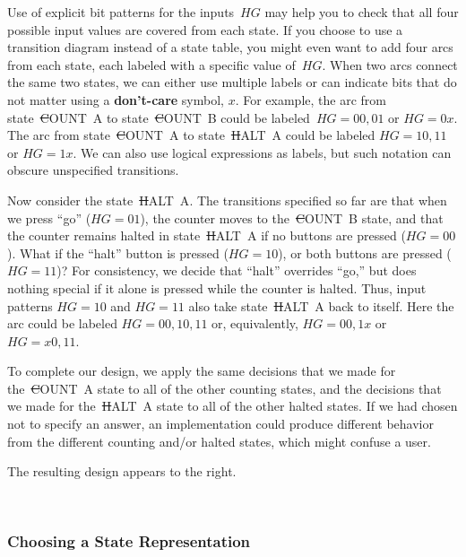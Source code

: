 Use of explicit bit patterns for the inputs~$HG$ may help you to check 
that all four possible input values are covered from each state.  If 
you choose to use a transition diagram instead of a state table,
you might even want to add four arcs from each state, each labeled 
with a specific
value of~$HG$.  When two arcs connect the same two states, we can either 
use multiple labels or can indicate bits that do not matter using a
{\bf don't-care} symbol, $x$.  For example, the arc from state~{\st COUNT~A}
to state~{\st COUNT~B} could be labeled~$HG=00,01$ or $HG=0x$.  The
arc from state~{\st COUNT~A} to state~{\st HALT~A} could be labeled
$HG=10,11$ or $HG=1x$.  We can also use logical expressions as labels,
but such notation can obscure unspecified transitions.

Now consider the state~{\st HALT~A}.  The transitions specified so far
are that when we press ``go'' ($HG=01$), the counter moves to 
the~{\st COUNT~B} state, and that the counter remains halted in 
state~{\st HALT~A} if no buttons are pressed ($HG=00$).
What if the ``halt'' button is pressed ($HG=10$), or
both buttons are pressed ($HG=11$)?  For consistency, we decide that
``halt'' overrides ``go,'' but does nothing special if it alone is pressed
while the counter is halted.  Thus, input patterns $HG=10$ and $HG=11$ also 
take state~{\st HALT~A} back to itself.
Here the arc could be labeled $HG=00,10,11$ or, equivalently,
$HG=00,1x$ or $HG=x0,11$.

\begin{minipage}{3.25in}
To complete our design, we apply the same decisions that we made for 
the~{\st COUNT~A} state to all of the other counting states, and the 
decisions that we made for the~{\st HALT~A} state to all of the other 
halted states.  If we had chosen not to specify an answer, an implementation
could produce different behavior from the different counting
and/or halted states, which might confuse a user.\mpline

The resulting design appears to the right.
\end{minipage}\hspace{.25in}%
\begin{minipage}{3in}
\end{minipage}\\ 


\subsubsection{Choosing a State Representation}

